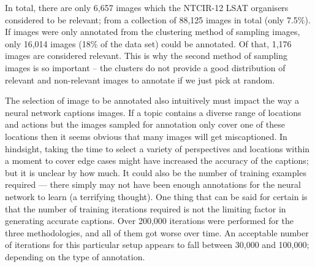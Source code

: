 In total, there are only 6,657 images which the NTCIR-12 LSAT organisers considered to be relevant; from a collection of 88,125 images in total (only 7.5\%). If images were only annotated from the clustering method of sampling images, only 16,014 images (18\% of the data set) could be annotated. Of that, 1,176 images are considered relevant. This is why the second method of sampling images is so important -- the clusters do not provide a good distribution of relevant and non-relevant images to annotate if we just pick at random.





The selection of image to be annotated also intuitively must impact the way a neural network captions images. If a topic contains a diverse range of locations and actions but the images sampled for annotation only cover one of these locations then it seems obvious that many images will get miscaptioned. In hindsight, taking the time to select a variety of perspectives and locations within a moment to cover edge cases might have increased the accuracy of the captions; but it is unclear by how much. It could also be the number of training examples required --- there simply may not have been enough annotations for the neural network to learn (a terrifying thought). One thing that can be said for certain is that the number of training iterations required is not the limiting factor in generating accurate captions. Over 200,000 iterations were performed for the three methodologies, and all of them got worse over time. An acceptable number of iterations for this particular setup appears to fall between 30,000 and 100,000; depending on the type of annotation.


